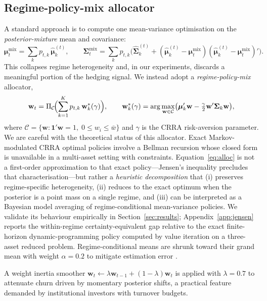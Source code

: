 \documentclass[review,12pt,authoryear]{elsarticle}
\begin{document}
\subsection{Regime-policy-mix allocator}
A standard approach is to compute one mean-variance optimisation on the
\emph{posterior-mixture} mean and covariance:
\[
\boldsymbol{\mu}_t^{\mathrm{mix}} = \sum_k p_{t,k}\,\hat{\boldsymbol{\mu}}_k^{(t)},
\qquad
\boldsymbol{\Sigma}_t^{\mathrm{mix}} = \sum_k p_{t,k}
\bigl(\hat{\boldsymbol{\Sigma}}_k^{(t)} + (\hat{\boldsymbol{\mu}}_k^{(t)} -
\boldsymbol{\mu}_t^{\mathrm{mix}})
(\hat{\boldsymbol{\mu}}_k^{(t)} - \boldsymbol{\mu}_t^{\mathrm{mix}})'\bigr).
\]
This collapses regime heterogeneity and, in our experiments, discards a meaningful
portion of the hedging signal. We instead adopt a \emph{regime-policy-mix} allocator,
\begin{equation}
\mathbf{w}_t = \Pi_{\mathcal{C}}\!\Bigl(
\sum_{k=1}^{K} p_{t,k}\,\mathbf{w}_k^{*}(\gamma)\Bigr),
\qquad
\mathbf{w}_k^{*}(\gamma) = \arg\max_{\mathbf{w}\in\mathcal{C}}
\bigl(\boldsymbol{\mu}_k'\mathbf{w} - \tfrac{\gamma}{2}\mathbf{w}'\boldsymbol{\Sigma}_k\mathbf{w}\bigr),
\label{eq:alloc}
\end{equation}
where $\mathcal{C} = \{\mathbf{w} : \mathbf{1}'\mathbf{w}=1,\; 0\le w_i \le \bar{w}\}$ and
$\gamma$ is the CRRA risk-aversion parameter. We are careful with the theoretical status of
this allocator. Exact Markov-modulated CRRA optimal policies
\citep{GuidolinTimmermann2007} involve a Bellman recursion whose closed form is unavailable
in a multi-asset setting with constraints. Equation~\eqref{eq:alloc} is not a first-order
approximation to that exact policy---Jensen's inequality precludes that characterisation---but
rather a \emph{heuristic decomposition} that (i) preserves regime-specific heterogeneity,
(ii) reduces to the exact optimum when the posterior is a point mass on a single regime,
and (iii) can be interpreted as a Bayesian model averaging of regime-conditional
mean-variance policies. We validate its behaviour empirically in
Section~\ref{sec:results}; Appendix~\ref{app:jensen} reports the within-regime
certainty-equivalent gap relative to the exact finite-horizon dynamic-programming policy
computed by value iteration on a three-asset reduced problem.
Regime-conditional means are shrunk toward their grand mean with weight $\alpha=0.2$ to
mitigate estimation error \citep{WolfLedoit2004}.

A weight inertia smoother $\mathbf{w}_t \leftarrow \lambda \mathbf{w}_{t-1} + (1-\lambda)
\mathbf{w}_t$ is applied with $\lambda = 0.7$ to attenuate churn driven by momentary
posterior shifts, a practical feature demanded by institutional investors with turnover
budgets.
\end{document}
